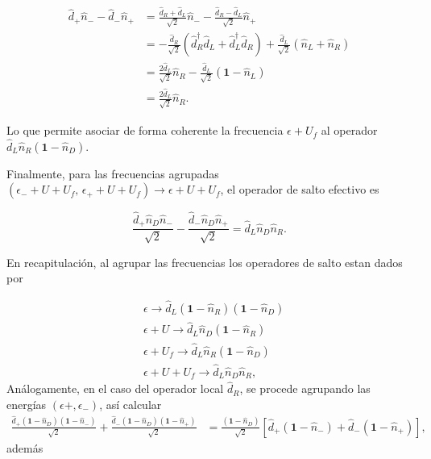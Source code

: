 \begin{appendixs}
\begin{align*}
    \hat{d}_{+}\hat{n}_{-} -\hat{d}_{-}\hat{n}_{+} & = \frac{\hat{d}_{R}+\hat{d}_{L}}{\sqrt{2}}\hat{n}_{-} - \frac{\hat{d}_{R}-\hat{d}_{L}}{\sqrt{2}}\hat{n}_{+} \\
    & = - \frac{\hat{d}_{R}}{\sqrt{2}}(\hat{d}^{\dagger}_{R}\hat{d}_{L}+ \hat{d}^{\dagger}_{L}\hat{d}_{R}) + \frac{\hat{d}_{L}}{\sqrt{2}}(\hat{n}_{L}+\hat{n}_{R}) \\
    & = \frac{2\hat{d}_{L}}{\sqrt{2}}\hat{n}_{R} - \frac{\hat{d}_{L}}{\sqrt{2}}(\textbf{1}-\hat{n}_{L}) \\
    & = \frac{2\hat{d}_{L}}{\sqrt{2}}\hat{n}_{R}.
\end{align*}

Lo que permite asociar de forma coherente la frecuencia $\epsilon + U_{f}$ al operador $\hat{d}_{L}\hat{n}_{R}(\mathbf{1}-\hat{n}_{D})$. 

Finalmente, para las frecuencias agrupadas $(\epsilon_{-} + U + U_{f},\, \epsilon_{+} + U + U_{f}) \to \epsilon + U + U_{f}$, el operador de salto efectivo es

\begin{equation*}
    \frac{\hat{d}_{+}\hat{n}_{D}\hat{n}_{-}}{\sqrt{2}} - \frac{\hat{d}_{-}\hat{n}_{D}\hat{n}_{+}}{\sqrt{2}} = \hat{d}_{L}\hat{n}_{D}\hat{n}_{R}.
\end{equation*}

En recapitulación, al agrupar las frecuencias los operadores de salto estan dados por 

\begin{align*}
    &\epsilon \to \hat{d}_{L}(\textbf{1}-\hat{n}_{R})(\textbf{1}-\hat{n}_{D})\\
   &\epsilon + U \to \hat{d}_{L}\hat{n}_{D}(\textbf{1}-\hat{n}_{R})\\
    &\epsilon +U_{f}\to \hat{d}_{L}\hat{n}_{R}(\textbf{1}-\hat{n}_{D})\\
    &\epsilon +U+U_{f}\to \hat{d}_{L}\hat{n}_{D}\hat{n}_{R},
\end{align*}
Análogamente, en el caso del operador local $\hat{d}_{R}$, se procede agrupando las energías $(\epsilon{+}, \epsilon_{-})$, así calcular  
\begin{align*}
    \frac{\hat{d}_{+}(\textbf{1}-\hat{n}_{D})(\textbf{1}-\hat{n}_{-}) }{\sqrt{2}} + \frac{\hat{d}_{-}(\textbf{1}-\hat{n}_{D})(\textbf{1}-\hat{n}_{+}) }{\sqrt{2}} & = \frac{(\textbf{1} - \hat{n}_{D})}{\sqrt{2}}[\hat{d}_{+}(\textbf{1}-\hat{n}_{-}) + \hat{d}_{-}(\textbf{1}-\hat{n}_{+})],
\end{align*}
además  


\end{appendixs}
